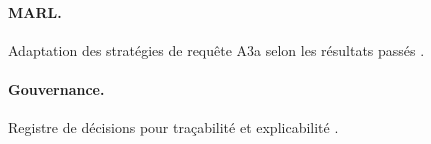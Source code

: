\documentclass[12pt,a4paper]{report}
\begin{document}
\paragraph{MARL.} Adaptation des stratégies de requête A3a selon les résultats
passés \citep{cmupaper2021}.

\paragraph{Gouvernance.} Registre de décisions pour traçabilité et explicabilité
\citep{milosevic2026}.



\end{document}
